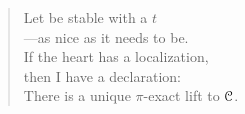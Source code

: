 


\vspace*{7cm}

\begin{verse}
    \hspace{8em}Let be stable with a $t$ \\
    \vspace{5pt}
    \hspace{8em}---as nice as it needs to be. \\
    \vspace{5pt}
    \hspace{8em}If the heart has a localization, \\
    \vspace{5pt}
    \hspace{8em}then I have a declaration: \\
    \vspace{5pt}
    \hspace{8em}There is a unique $\pi$-exact lift to $\EuScript{C}$. 

\end{verse}